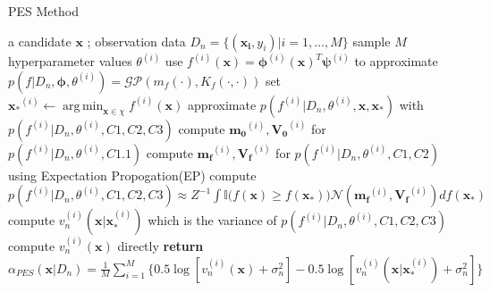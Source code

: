 \documentclass[a4paper,11pt]{report}
\DeclareMathOperator*{\argmin}{arg\,min}
\begin{document}
\begin{algorithm} [H]
\caption{PES Method }\label{methodpes}
\begin{algorithmic}[1]
\INPUT a candidate $\mathbf{x}$ ; observation data $D_n=\{(\mathbf{x_{i}},y_{i}) \vert i=1, \dots, M\}$
\Statex
	\State sample $M$ hyperparameter values ${\theta^{(i)}}$
	\State use  $f^{(i)}(\mathbf{x}) =\boldsymbol{\phi}^{(i)}(\mathbf{x})^{T} \boldsymbol{\psi}^{(i)}$ to approximate $p(f \vert D_n,\boldsymbol{\phi},\theta^{(i)})= \mathcal{GP}(m_f(\cdot),K_f(\cdot,\cdot)) $
	\State set $\mathbf{x_{*}}^{(i)} \leftarrow  \argmin_{\mathbf{x}\in\chi} f^{(i)} (\mathbf{x})$
	\State approximate $p(f^{(i)} \vert D_n,\theta^{(i)}, \mathbf{x}, \mathbf{x}_{*})$ with $p(f^{(i)} \vert D_n,\theta^{(i)},C1,C2,C3)$
	\State compute $\mathbf{m_0}^{(i)}, \mathbf{V_0}^{(i)} $ for $p(f^{(i)} \vert D_n,\theta^{(i)},C1.1)$ 
	\State compute $\mathbf{{m}_f}^{(i)}, \mathbf{V_f}^{(i)}$ for $p(f^{(i)} \vert D_n,\theta^{(i)},C1,C2)$ using Expectation Propogation(EP)
	\State compute $p(f^{(i)} \vert D_n,\theta^{(i)},C1,C2,C3)\approx Z^{-1}\int \mathbb{I} \big(f(\mathbf{x})\geq f(\mathbf{x}_{*})\big) \mathcal{N}(\mathbf{{m}_f}^{(i)},\mathbf{V_f}^{(i)}) df(\mathbf{x}_{*}) $
	\State compute $v_{n}^{(i)}(\mathbf{x} \vert \mathbf{x}_{*}^{(i)})$ which is the variance of $p(f^{(i)} \vert D_n,\theta^{(i)},C1,C2,C3)$
	\State compute $v_{n}^{(i)}(\mathbf{x})$ directly 
	\EndFor
	\State \textbf{return}  $\alpha_{PES}(\mathbf{x} \vert D_n)=\frac{1}{M} \sum_{i=1}^{M} \{ 0.5\log[v_{n}^{(i)}(\mathbf{x}) + \sigma_n^2]-0.5\log[v_{n}^{(i)}(\mathbf{x} \vert \mathbf{x}_{*}^{(i)})+\sigma_n^2]\}$
\end{algorithmic}
\end{algorithm}
\end{document}
